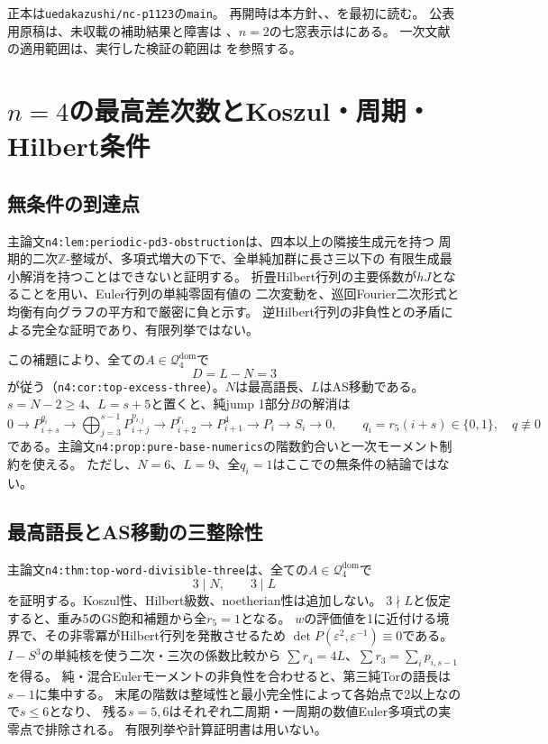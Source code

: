 \documentclass[11pt,a4paper]{ltjsarticle}
\begin{document}
正本は\texttt{uedakazushi/nc-p1123}の\texttt{main}。
再開時は本方針、、を最初に読む。
公表用原稿は、未収載の補助結果と障害は
、$n=2$の七窓表示はにある。
一次文献の適用範囲は、実行した検証の範囲は
を参照する。

\section{\texorpdfstring{$n=4$}{n=4}の最高差次数とKoszul・周期・Hilbert条件}
\subsection{無条件の到達点}
主論文\texttt{n4:lem:periodic-pd3-obstruction}は、四本以上の隣接生成元を持つ
周期的二次$\mathbb Z$-整域が、多項式増大の下で、全単純加群に長さ三以下の
有限生成最小解消を持つことはできないと証明する。
折畳Hilbert行列の主要係数が$hJ$となることを用い、Euler行列の単純零固有値の
二次変動を、巡回Fourier二次形式と均衡有向グラフの平方和で厳密に負と示す。
逆Hilbert行列の非負性との矛盾による完全な証明であり、有限列挙ではない。

この補題により、全ての$A\in\mathcal Q_4^{\mathrm{dom}}$で
\[
D=L-N=3
\]
が従う（\texttt{n4:cor:top-excess-three}）。$N$は最高語長、$L$はAS移動である。
$s=N-2\ge4$、$L=s+5$と置くと、純jump 1部分$B$の解消は
\[
0\to P_{i+s}^{q_i}\to\bigoplus_{j=3}^{s-1}P_{i+j}^{p_{i,j}}
\to P_{i+2}^{r_i}\to P_{i+1}^{4}\to P_i\to S_i\to0,
\qquad q_i=r_5(i+s)\in\{0,1\},\quad q\not\equiv0
\]
である。主論文\texttt{n4:prop:pure-base-numerics}の階数釣合いと一次モーメント制約を使える。
ただし、$N=6$、$L=9$、全$q_i=1$はここでの無条件の結論ではない。

\subsection{最高語長とAS移動の三整除性}
主論文\texttt{n4:thm:top-word-divisible-three}は、全ての$A\in\mathcal Q_4^{\mathrm{dom}}$で
\[
3\mid N,\qquad 3\mid L
\]
を証明する。Koszul性、Hilbert級数、noetherian性は追加しない。
$3\nmid L$と仮定すると、重み5のGS飽和補題から全$r_5=1$となる。
$w$の評価値を1に近付ける境界で、その非零冪がHilbert行列を発散させるため
$\det P(\varepsilon^2,\varepsilon^{-1})\equiv0$である。
$I-S^3$の単純核を使う二次・三次の係数比較から
$\sum r_4=4L$、$\sum r_3=\sum_i p_{i,s-1}$を得る。
純・混合Eulerモーメントの非負性を合わせると、第三純Torの語長は$s-1$に集中する。
末尾の階数は整域性と最小完全性によって各始点で2以上なので$s\le6$となり、
残る$s=5,6$はそれぞれ二周期・一周期の数値Euler多項式の実零点で排除される。
有限列挙や計算証明書は用いない。
\end{document}
